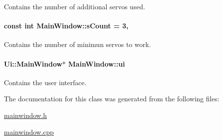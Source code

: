 Contains the number of additional servos used. 

\hypertarget{a00005_a646727b1c45c72638325adfd460649c0}{}
\paragraph[{s\+Count}]{\setlength{\rightskip}{0pt plus 5cm}const int Main\+Window\+::s\+Count = 3\hspace{0.3cm}{\ttfamily [static]}, {\ttfamily [private]}}\label{a00005_a646727b1c45c72638325adfd460649c0}


Contains the number of minimun servos to work. 

\hypertarget{a00005_a35466a70ed47252a0191168126a352a5}{}
\paragraph[{ui}]{\setlength{\rightskip}{0pt plus 5cm}Ui\+::\+Main\+Window$\ast$ Main\+Window\+::ui\hspace{0.3cm}{\ttfamily [private]}}\label{a00005_a35466a70ed47252a0191168126a352a5}


Contains the user interface. 



The documentation for this class was generated from the following files\+:\begin{DoxyCompactItemize}
\item 
\hyperlink{a00018}{mainwindow.\+h}\item 
\hyperlink{a00017}{mainwindow.\+cpp}\end{DoxyCompactItemize}
